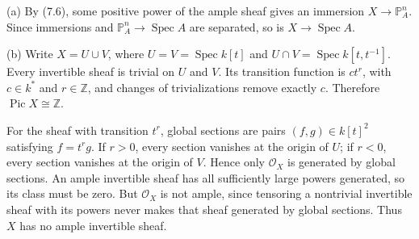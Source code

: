 (a) By (7.6), some positive power of the ample sheaf gives an immersion $X\to\mathbb P_A^n$. Since immersions and $\mathbb P_A^n\to\operatorname{Spec}A$ are separated, so is $X\to\operatorname{Spec}A$.

(b) Write $X=U\cup V$, where $U=V=\operatorname{Spec}k[t]$ and $U\cap V=\operatorname{Spec}k[t,t^{-1}]$. Every invertible sheaf is trivial on $U$ and $V$. Its transition function is $ct^r$, with $c\in k^*$ and $r\in\mathbb Z$, and changes of trivializations remove exactly $c$. Therefore $\operatorname{Pic}X\cong\mathbb Z$.

For the sheaf with transition $t^r$, global sections are pairs $(f,g)\in k[t]^2$ satisfying $f=t^rg$. If $r>0$, every section vanishes at the origin of $U$; if $r<0$, every section vanishes at the origin of $V$. Hence only $\mathcal O_X$ is generated by global sections. An ample invertible sheaf has all sufficiently large powers generated, so its class must be zero. But $\mathcal O_X$ is not ample, since tensoring a nontrivial invertible sheaf with its powers never makes that sheaf generated by global sections. Thus $X$ has no ample invertible sheaf.
